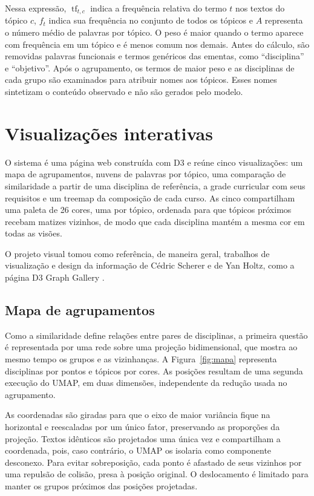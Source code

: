 \documentclass[
  12pt,
  oneside,
  a4paper,
  article,
  brazil
]{USPSC-classe/USPSC}
\begin{document}
Nessa expressão, $\operatorname{tf}_{t,c}$ indica a frequência relativa do termo
$t$ nos textos do tópico $c$, $f_t$ indica sua frequência no conjunto de todos
os tópicos e $A$ representa o número médio de palavras por tópico. O peso é
maior quando o termo aparece com frequência em um tópico e é menos comum nos
demais. Antes do cálculo, são removidas palavras funcionais e termos genéricos
das ementas, como ``disciplina'' e ``objetivo''. Após o agrupamento, os termos
de maior peso e as disciplinas de cada grupo são examinados para atribuir nomes
aos tópicos. Esses nomes sintetizam o conteúdo observado e não são gerados pelo
modelo.

\section{Visualizações interativas}

O sistema é uma página web construída com D3 \cite{bostock2011} e reúne cinco
visualizações: um mapa de agrupamentos, nuvens de palavras por tópico, uma
comparação de similaridade a partir de uma disciplina de referência, a grade
curricular com seus requisitos e um treemap da composição de cada curso. As
cinco compartilham uma paleta de 26 cores, uma por tópico,
ordenada para que tópicos próximos recebam matizes vizinhos, de modo que cada
disciplina mantém a mesma cor em todas as visões.

O projeto visual tomou como referência, de maneira geral, trabalhos de
visualização e design da informação de Cédric Scherer e de Yan Holtz, como a
página D3 Graph Gallery \cite{scherer,holtz}.

\subsection{Mapa de agrupamentos}

Como a similaridade define relações entre pares de disciplinas, a primeira
questão é representada por uma rede sobre uma projeção bidimensional, que mostra
ao mesmo tempo os grupos e as vizinhanças. A Figura~\ref{fig:mapa} representa disciplinas por pontos e tópicos por cores.
As posições resultam de uma segunda execução do UMAP, em duas dimensões,
independente da redução usada no agrupamento.

As coordenadas são giradas para que o eixo de maior variância fique na
horizontal e reescaladas por um único fator, preservando as proporções da
projeção. Textos idênticos são projetados
uma única vez e compartilham a coordenada, pois, caso contrário, o UMAP os
isolaria como componente desconexo. Para evitar sobreposição, cada ponto é
afastado de seus vizinhos por uma repulsão de colisão, presa à posição original.
O deslocamento é limitado para manter os grupos próximos das posições projetadas.
\end{document}
